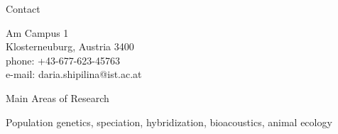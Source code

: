 \documentclass[10pt]{article}
\date{}
\begin{document}


\newlength{\oldcvlabelwidth}
\renewcommand*{\cvbibname}{}




\begin{cv}%



\begin{cvlist}{Contact}
    \item Am Campus 1\\
     Klosterneuburg, Austria 3400\\
      phone: +43-677-623-45763\\
      e-mail: daria.shipilina@ist.ac.at%
\end{cvlist}

\begin{cvlist}{Main Areas of Research}
\item Population genetics, speciation, hybridization, bioacoustics, animal ecology
\end{cvlist}


\end{cv}
\end{document}
